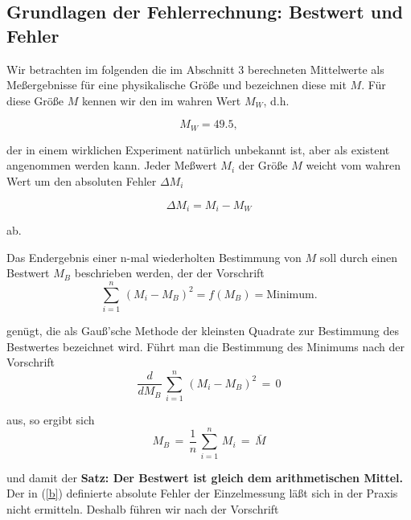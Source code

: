 \subsection{Grundlagen der Fehlerrechnung: Bestwert und Fehler}

Wir betrachten im folgenden die im Abschnitt 3 berechneten Mittelwerte
als Meßergebnisse für eine physikalische Größe und bezeichnen diese mit
$M$. Für diese Größe $M$ kennen wir den im wahren Wert $M_W$, d.h.

\begin{equation}\label{a}
M_W = 49.5,
\end{equation}

der in einem wirklichen Experiment natürlich unbekannt ist, aber als
existent angenommen werden kann. Jeder Meßwert $M_i$ der Größe $M$
weicht vom wahren Wert um den absoluten Fehler $\Delta M_i$

\begin{equation} \label{b}
\Delta M_i = M_i - M_W
\end{equation}

ab.


Das Endergebnis einer n-mal wiederholten Bestimmung von $M$ soll
durch einen Bestwert $M_B$ beschrieben werden, der der Vorschrift\\

\begin{equation} \label{c}
\sum_{i=1}^{n}\, (M_{i} - M_{B})^{2} = f(M_{B}) = \mbox{Minimum}.
\end{equation}



genügt, die als Gauß'sche Methode der kleinsten Quadrate zur Bestimmung
des Bestwertes bezeichnet wird. Führt man die Bestimmung des Minimums
nach der Vorschrift\\

\begin{equation} \label{d}
\frac{d}{d M_B}\,\sum_{i=1}^{n}\,(M_{i} - M_{B})^{2}\,=\,0
\end{equation}

aus, so ergibt sich\\

\begin{equation} \label{e}
M_{B}\,=\,\frac{1}{n}\,\sum_{i=1}^{n}\,M_{i}\,=\,\bar M
\end{equation}

und damit der {\bf Satz: Der Bestwert ist gleich dem arithmetischen Mittel.}\\


Der in (\ref{b}) definierte absolute Fehler der Einzelmessung läßt sich
in der Praxis nicht ermitteln. Deshalb führen wir nach der Vorschrift\\

